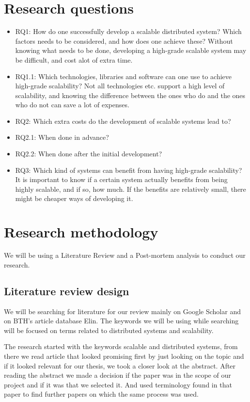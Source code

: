 \documentclass{article}
\begin{document}
\newpage

\section{Research questions}
\begin{itemize}
\item{RQ1: How do one successfully develop a scalable distributed system? Which
factors needs to be considered, and how does one achieve these? Without knowing
what needs to be done, developing a high-grade scalable system may be
difficult, and cost alot of extra time.} 

\item{RQ1.1: Which technologies, libraries and software can one use to achieve
high-grade scalability? Not all technologies etc. support a high level of
scalability, and knowing the difference between the ones who do and the ones
who do not can save a lot of expenses.}

\item{RQ2: Which extra costs do the development of scalable systems lead to?} 
\item{RQ2.1: When done in advance?} 
\item{RQ2.2: When done after the initial development?} 

\item{RQ3: Which kind of systems can benefit from having high-grade scalability?
It is important to know if a certain system actually benefits from being highly
scalable, and if so, how much. If the benefits are relatively small, there 
might be cheaper ways of developing it.}

\end{itemize}

\section{Research methodology}
We will be using a Literature Review and a Post-mortem analysis to conduct our 
research. 

\subsection{Literature review design}
We will be searching for literature for our review mainly on Google Scholar and
on BTH's article database Elin. The keywords we will be using while searching 
will be focused on terms related to distributed systems and scalability.

The research started with the keywords scalable and distributed systems,
from there we read article that looked promising first by just looking on
the topic and if it looked relevant for our thesis, we took a closer look
at the abstract. After reading the abstract we made a decision if the paper
was in the scope of our project and if it was that we selected it. And used
terminology found in that paper to find further papers on which the same 
process was used. 
\newline
\end{document}
